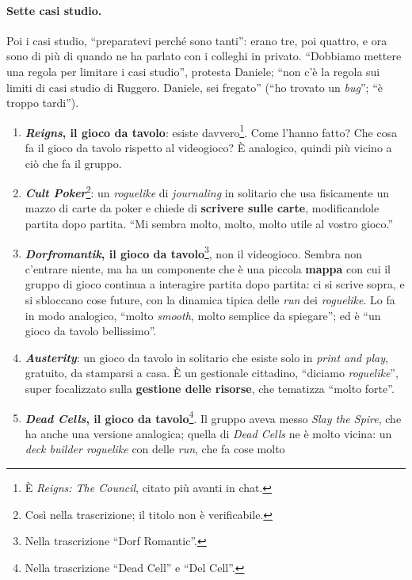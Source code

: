 \paragraph{Sette casi studio.} Poi i casi studio, ``preparatevi perché sono tanti'': erano
tre, poi quattro, e ora sono di più di quando ne ha parlato con i colleghi in privato.
``Dobbiamo mettere una regola per limitare i casi studio'', protesta Daniele; ``non c'è
la regola sui limiti di casi studio di Ruggero. Daniele, sei fregato'' (``ho trovato un
\emph{bug}''; ``è troppo tardi'').
\begin{enumerate}
  \item \textbf{\emph{Reigns}, il gioco da tavolo}: esiste davvero\footnote{È
        \emph{Reigns: The Council}, citato più avanti in chat.}. Come l'hanno fatto? Che
        cosa fa il gioco da tavolo rispetto al videogioco? È analogico, quindi più vicino
        a ciò che fa il gruppo.
  \item \textbf{\emph{Cult Poker}}\footnote{Così nella trascrizione; il titolo non è
        verificabile.}: un \emph{roguelike} di \emph{journaling} in solitario che usa
        fisicamente un mazzo di carte da poker e chiede di \textbf{scrivere sulle
        carte}, modificandole partita dopo partita. ``Mi sembra molto, molto, molto
        utile al vostro gioco.''
  \item \textbf{\emph{Dorfromantik}, il gioco da tavolo}\footnote{Nella trascrizione
        ``Dorf Romantic''.}, non il videogioco. Sembra non c'entrare niente, ma ha un
        componente che è una piccola \textbf{mappa} con cui il gruppo di gioco continua a
        interagire partita dopo partita: ci si scrive sopra, e si sbloccano cose future,
        con la dinamica tipica delle \emph{run} dei \emph{roguelike}. Lo fa in modo
        analogico, ``molto \emph{smooth}, molto semplice da spiegare''; ed è ``un gioco
        da tavolo bellissimo''.
  \item \textbf{\emph{Austerity}}: un gioco da tavolo in solitario che esiste solo in
        \emph{print and play}, gratuito, da stamparsi a casa. È un gestionale cittadino,
        ``diciamo \emph{roguelike}'', super focalizzato sulla \textbf{gestione delle
        risorse}, che tematizza ``molto forte''.
  \item \textbf{\emph{Dead Cells}, il gioco da tavolo}\footnote{Nella trascrizione ``Dead
        Cell'' e ``Del Cell''.}. Il gruppo aveva messo \emph{Slay the Spire}, che ha
        anche una versione analogica; quella di \emph{Dead Cells} ne è molto vicina: un
        \emph{deck builder roguelike} con delle \emph{run}, che fa cose molto

\end{enumerate}
